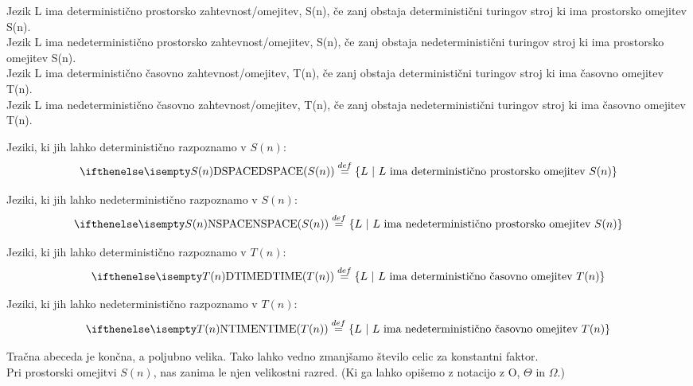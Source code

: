 \documentclass[10pt,a4paper,oneside]{book}
\begin{document}
Jezik L ima deterministično prostorsko zahtevnost/omejitev, S(n), če zanj obstaja deterministični turingov stroj ki ima prostorsko omejitev S(n).\\
Jezik L ima nedeterministično prostorsko zahtevnost/omejitev, S(n), če zanj obstaja nedeterministični turingov stroj ki ima prostorsko omejitev S(n).\\
Jezik L ima deterministično časovno zahtevnost/omejitev, T(n), če zanj obstaja deterministični turingov stroj ki ima časovno omejitev T(n).\\
Jezik L ima nedeterministično časovno zahtevnost/omejitev, T(n), če zanj obstaja nedeterministični turingov stroj ki ima časovno omejitev T(n).
\br
{}
\begin{items}
\item Jeziki, ki jih lahko deterministično razpoznamo v $S(n)$:
\[ \DSPACE{S(n)} \PoDef \{ L \| L \mbox{ ima deterministično prostorsko omejitev } S(n) \} \]
\item Jeziki, ki jih lahko nedeterministično razpoznamo v $S(n)$:
\[ \NSPACE{S(n)} \PoDef \{ L \| L \mbox{ ima nedeterministično prostorsko omejitev } S(n) \} \]
\item Jeziki, ki jih lahko deterministično razpoznamo v $T(n)$:
\[ \DTIME{T(n)} \PoDef \{ L \| L \mbox{ ima deterministično časovno omejitev } T(n) \} \]
\item Jeziki, ki jih lahko nedeterministično razpoznamo v $T(n)$:
\[ \NTIME{T(n)} \PoDef \{ L \| L \mbox{ ima nedeterministično časovno omejitev } T(n) \} \]
\end{items}
Tračna abeceda je končna, a poljubno velika.
Tako lahko vedno zmanjšamo število celic za konstantni faktor.\\%
Pri prostorski omejitvi $S(n)$, nas zanima le njen velikostni razred. (Ki ga lahko opišemo z notacijo z O, $\Theta$ in $\Omega$.)
\end{document}
